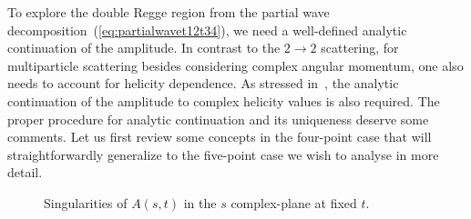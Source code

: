To explore the double Regge region from the partial wave decomposition~(\ref{eq:partialwavet12t34}), we need a well-defined analytic continuation of the amplitude.
In contrast to the $2\to2$ scattering, for multiparticle scattering besides considering complex angular momentum, one also needs to account for helicity  dependence.
As stressed in~\cite{Goddard:1971fq, White:1972rq, White:1972sc, White:1973ola},  the analytic continuation of the amplitude to complex helicity values is also required.
The proper procedure for analytic continuation and its uniqueness deserve some comments.
Let us first review some concepts in the four-point case that will straightforwardly generalize to the five-point case we wish to analyse in more detail.
\begin{figure}[t!]
  \centering
  \caption{Singularities of $A(s,t)$ in the $s$ complex-plane at fixed $t$.}
  \label{fig:cutssplane}
\end{figure}


